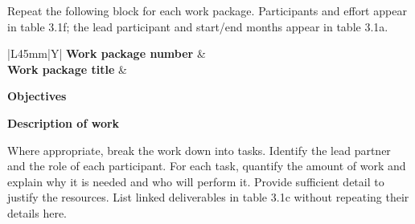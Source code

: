 \label{tab:work-package-description}
\begin{heguidance}
Repeat the following block for each work package. Participants and effort appear
in table 3.1f; the lead participant and start/end months appear in table 3.1a.
\end{heguidance}

\noindent
\begin{tabularx}{\linewidth}{|L{45mm}|Y|}
\hline
\textbf{Work package number} &  \\
\hline
\textbf{Work package title} &  \\
\hline
\end{tabularx}
\begin{tcolorbox}[enhanced,breakable,colback=white,colframe=black,
  boxrule=0.4bp,arc=0pt,left=5bp,right=5bp,top=5bp,bottom=5bp,
  before skip=0pt,after skip=4bp]
\textbf{Objectives}\par
{}
\par\medskip
\textbf{Description of work}\par
\begin{heguidance}
Where appropriate, break the work down into tasks. Identify the lead partner
and the role of each participant. For each task, quantify the amount of work
and explain why it is needed and who will perform it. Provide sufficient detail
to justify the resources. List linked deliverables in table 3.1c without
repeating their details here.
\end{heguidance}
\end{tcolorbox}

